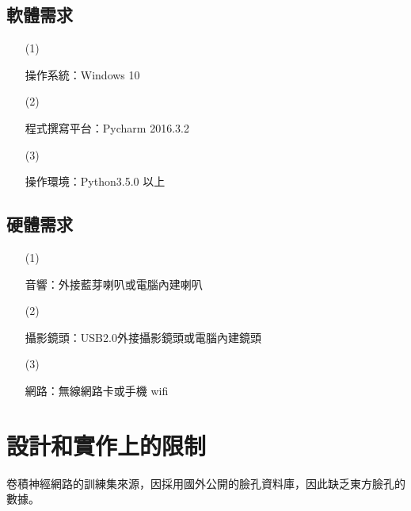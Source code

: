 \documentclass[12pt]{scrreprt}
\begin{document}
\subsection{軟體需求}
\begin{itemize}
\item[(1)]{\begin{bfseries}{操作系統：}Windows 10\end{bfseries}}
\item[(2)]{\begin{bfseries}{程式撰寫平台：}Pycharm 2016.3.2\end{bfseries}}
\item[(3)]{\begin{bfseries}{操作環境：}Python3.5.0 以上\end{bfseries}}
\end{itemize}

\subsection{硬體需求}
\begin{itemize}
\item[(1)]{\begin{bfseries}{音響：}外接藍芽喇叭或電腦內建喇叭\end{bfseries}}
\item[(2)]{\begin{bfseries}{攝影鏡頭：}USB2.0外接攝影鏡頭或電腦內建鏡頭\end{bfseries}}
\item[(3)]{\begin{bfseries}{網路：}無線網路卡或手機 wifi\end{bfseries}}

\end{itemize}

\section{設計和實作上的限制}
卷積神經網路的訓練集來源，因採用國外公開的臉孔資料庫，因此缺乏東方臉孔的數據。
\end{document}
